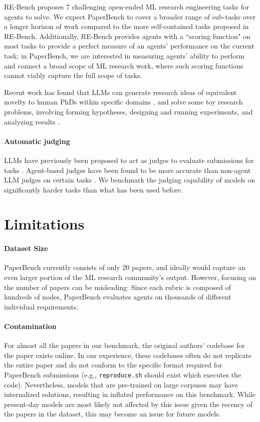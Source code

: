 \documentclass{article}
\theoremstyle{plain}
\theoremstyle{definition}
\theoremstyle{remark}
\begin{document}
RE-Bench \citep{wijk2024re} proposes 7 challenging open-ended ML research engineering tasks for agents to solve. We expect PaperBench to cover a broader range of sub-tasks over a longer horizon of work compared to the more self-contained tasks proposed in RE-Bench. Additionally, RE-Bench provides agents with a ``scoring function" on most tasks to provide a perfect measure of an agents' performance on the current task;  in PaperBench, we are interested in measuring agents’ ability to perform and connect a broad scope of ML research work, where such scoring functions cannot viably capture the full scope of tasks.

Recent work has found that LLMs can generate research ideas of equivalent novelty to human PhDs within specific domains \citep{si2024can}, and solve some toy research problems, involving forming hypotheses, designing and running experiments, and analyzing results \citep{jansen2024discoveryworld, wang2022scienceworld}.

\paragraph{Automatic judging}
LLMs have previously been proposed to act as judges to evaluate submissions for tasks \citep{zheng2023judging, chen2024mllm, fu2023gptscore}. Agent-based judges have been found to be more accurate than non-agent LLM judges on certain tasks \citep{zhuge2024agent}. We benchmark the judging capability of models on significantly harder tasks than what has been used before.

\section{Limitations}
\label{sec:limitations}

\paragraph{Dataset Size} PaperBench currently consists of only 20 papers, and ideally would capture an even larger portion of the ML research community’s output. However, focusing on the number of papers can be misleading: Since each rubric is composed of hundreds of nodes, PaperBench evaluates agents on thousands of different individual requirements.

\paragraph{Contamination} For almost all the papers in our benchmark, the original authors' codebase for the paper exists online. In our experience, these codebases often do not replicate the entire paper and do not conform to the specific format required for PaperBench submissions (e.g., \texttt{reproduce.sh} should exist which executes the code). Nevertheless, models that are pre-trained on large corpuses may have internalized solutions, resulting in inflated performance on this benchmark. While present-day models are most likely not affected by this issue given the recency of the papers in the dataset, this may become an issue for future models.
\end{document}
